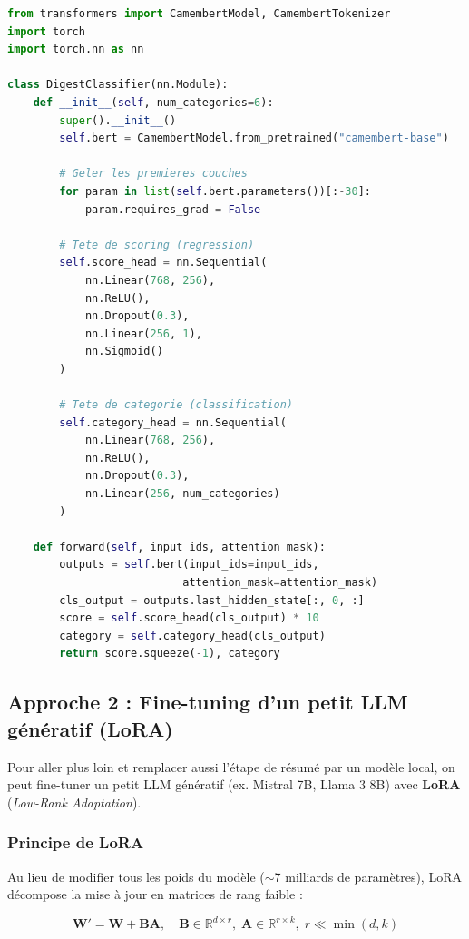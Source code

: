 \documentclass[11pt, a4paper]{article}
\begin{document}
\begin{lstlisting}[language=Python, caption={Code de fine-tuning (PyTorch + HuggingFace)}]
from transformers import CamembertModel, CamembertTokenizer
import torch
import torch.nn as nn

class DigestClassifier(nn.Module):
    def __init__(self, num_categories=6):
        super().__init__()
        self.bert = CamembertModel.from_pretrained("camembert-base")

        # Geler les premieres couches
        for param in list(self.bert.parameters())[:-30]:
            param.requires_grad = False

        # Tete de scoring (regression)
        self.score_head = nn.Sequential(
            nn.Linear(768, 256),
            nn.ReLU(),
            nn.Dropout(0.3),
            nn.Linear(256, 1),
            nn.Sigmoid()
        )

        # Tete de categorie (classification)
        self.category_head = nn.Sequential(
            nn.Linear(768, 256),
            nn.ReLU(),
            nn.Dropout(0.3),
            nn.Linear(256, num_categories)
        )

    def forward(self, input_ids, attention_mask):
        outputs = self.bert(input_ids=input_ids,
                           attention_mask=attention_mask)
        cls_output = outputs.last_hidden_state[:, 0, :]
        score = self.score_head(cls_output) * 10
        category = self.category_head(cls_output)
        return score.squeeze(-1), category
\end{lstlisting}

\subsection{Approche 2 : Fine-tuning d'un petit LLM génératif (LoRA)}

Pour aller plus loin et remplacer aussi l'étape de résumé par un modèle local, on peut fine-tuner un petit LLM génératif (ex. Mistral 7B, Llama 3 8B) avec \textbf{LoRA} (\textit{Low-Rank Adaptation}).

\subsubsection{Principe de LoRA}

Au lieu de modifier tous les poids du modèle ($\sim$7 milliards de paramètres), LoRA décompose la mise à jour en matrices de rang faible :

\begin{equation}
    \mathbf{W}' = \mathbf{W} + \mathbf{B}\mathbf{A}, \quad \mathbf{B} \in \mathbb{R}^{d \times r}, \; \mathbf{A} \in \mathbb{R}^{r \times k}, \; r \ll \min(d, k)
\end{equation}
\end{document}
